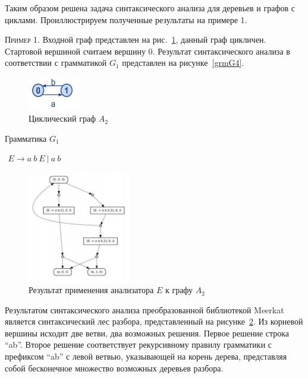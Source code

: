Таким образом решена задача синтаксического анализа для деревьев и графов с циклами. Проиллюстрируем полученные результаты на примере 1.

\textsc{Пример 1.} 
Входной граф представлен на рис.~\ref{Graph2}, данный граф цикличен. Стартовой вершиной считаем вершину 0. Результат синтаксического анализа в соответствии с грамматикой $G_1$ представлен на рисунке~\ref{grmG4}.

\begin{figure}
 \centering
 \includegraphics[width=0.2\textwidth]{Smolina/pics/Graph2.png}
 \caption{Циклический граф $A_2$}
 \label{Graph2}
\end{figure}

\begin{listing}
\caption{Грамматика $G_1$}
\label{grmG4}
\centering
$\begin{array}{rl}
E \rightarrow a \ b \ E \ | \ a \ b
\end{array}$
 \end{listing}

\begin{figure}
 \centering
 \includegraphics[width=0.4\textwidth]{Smolina/pics/Tree1.png}
 \caption{Результат применения анализатора $E$ к графу $A_2$}
 \label{Tree1}
\end{figure}

Результатом синтаксического анализа преобразованной библиотекой Meerkat является синтаксический лес разбора, представленный на рисунке~\ref{Tree1}. Из корневой вершины исходит две ветви, два возможных решения. Первое решение строка ``ab''. Второе решение соответствует рекурсивному правилу грамматики с префиксом ``ab'' с левой ветвью, указывающей на корень дерева, представляя собой бесконечное множество возможных деревьев разбора.


